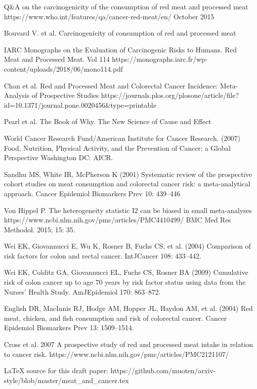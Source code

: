 \documentclass{article}
\begin{document}
\begin{thebibliography}{1}

\newblock Q\&A on the carcinogenicity of the consumption of red meat and processed meat
\newblock https://www.who.int/features/qa/cancer-red-meat/en/
\newblock October 2015

Bouvard V. et al.
\newblock Carcinogenicity of consumption of red and processed meat

IARC Monographs on the Evaluation of Carcinogenic Risks to Humans. Red Meat and Processed Meat. Vol 114
https://monographs.iarc.fr/wp-content/uploads/2018/06/mono114.pdf

Chan et al.
\newblock Red and Processed Meat and Colorectal Cancer Incidence: Meta-Analysis of Prospective Studies
https://journals.plos.org/plosone/article/file?id=10.1371/journal.pone.0020456\&type=printable

Pearl et al.
\newblock The Book of Why. The New Science of Cause and Effect

World Cancer Research Fund/American Institute for Cancer Research. (2007)
Food, Nutrition, Physical Activity, and the Prevention of Cancer: a Global
Perspective Washington DC: AICR.

Sandhu MS, White IR, McPherson K (2001) Systematic review of the
prospective cohort studies on meat consumption and colorectal cancer risk: a
meta-analytical approach. Cancer Epidemiol Biomarkers Prev 10: 439–446

Von Hippel P.
The heterogeneity statistic I2 can be biased in small meta-analyses
https://www.ncbi.nlm.nih.gov/pmc/articles/PMC4410499/
BMC Med Res Methodol. 2015; 15: 35.

Wei EK, Giovannucci E, Wu K, Rosner B, Fuchs CS, et al. (2004) Comparison
of risk factors for colon and rectal cancer. IntJCancer 108: 433–442.

Wei EK, Colditz GA, Giovannucci EL, Fuchs CS, Rosner BA (2009)
Cumulative risk of colon cancer up to age 70 years by risk factor status using
data from the Nurses’ Health Study. AmJEpidemiol 170: 863–872.

English DR, MacInnis RJ, Hodge AM, Hopper JL, Haydon AM, et al. (2004)
Red meat, chicken, and fish consumption and risk of colorectal cancer. Cancer
Epidemiol Biomarkers Prev 13: 1509–1514.

Cross et al. 2007
\newblock A prospective study of red and processed meat intake in relation to cancer risk.
https://www.ncbi.nlm.nih.gov/pmc/articles/PMC2121107/

LaTeX source for this draft paper:
https://github.com/muoten/arxiv-style/blob/master/meat\_and\_cancer.tex
\end{thebibliography}
\end{document}
